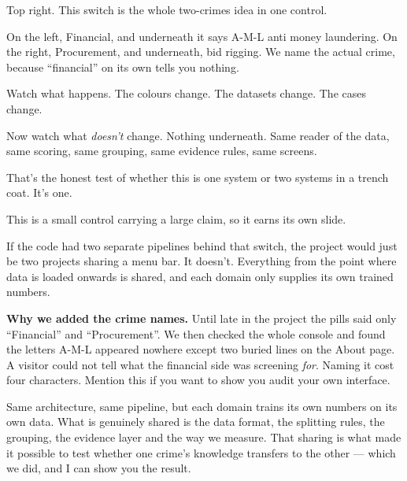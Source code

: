 \documentclass[11pt]{article}
\begin{document}


\begin{saythis}
Top right. This switch is the whole two-crimes idea in one control.

On the left, Financial, and underneath it says A-M-L \bt anti money laundering.
On the right, Procurement, and underneath, bid rigging. We name the actual
crime, because ``financial'' on its own tells you nothing.

 Watch what happens. The colours change. The datasets
change. The cases change.

Now watch what \emph{doesn't} change. Nothing underneath. Same reader of the
data, same scoring, same grouping, same evidence rules, same screens.

That's the honest test of whether this is one system or two systems in a
trench coat. It's one.
\end{saythis}

\begin{means}
This is a small control carrying a large claim, so it earns its own slide.

If the code had two separate pipelines behind that switch, the project would
just be two projects sharing a menu bar. It doesn't. Everything from the point
where data is loaded onwards is shared, and each domain only supplies its own
trained numbers.

\textbf{Why we added the crime names.} Until late in the project the pills said
only ``Financial'' and ``Procurement''. We then checked the whole console and
found the letters A-M-L appeared nowhere except two buried lines on the About
page. A visitor could not tell what the financial side was screening
\emph{for}. Naming it cost four characters. Mention this if you want to show
you audit your own interface.
\end{means}

\begin{asked}
 Same architecture, same pipeline, but each domain
trains its own numbers on its own data. What is genuinely shared is the data
format, the splitting rules, the grouping, the evidence layer and the way we
measure. That sharing is what made it possible to test whether one crime's
knowledge transfers to the other --- which we did, and I can show you the
result.
\end{asked}
\end{document}
